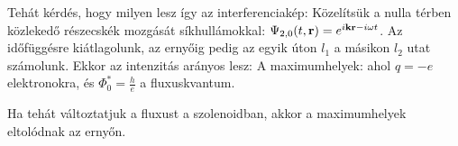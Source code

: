    Tehát kérdés, hogy milyen lesz így az interferenciakép:
   Közelítsük a nulla térben közlekedő részecskék mozgását síkhullámokkal: $\Psi_{2,0}(t,\mathbf{r})=e^{i\mathbf{k}\mathbf{r}-i\omega t}$. Az időfüggésre kiátlagolunk, az ernyőig pedig az egyik úton $l_1$ a másikon $l_2$ utat számolunk. Ekkor az intenzitás arányos lesz:
   A maximumhelyek:
   ahol $q=-e$ elektronokra, és $\Phi_0^*=\frac{h}{e}$ a fluxuskvantum.
   
   Ha tehát változtatjuk a fluxust a szolenoidban, akkor a maximumhelyek eltolódnak az ernyőn. 